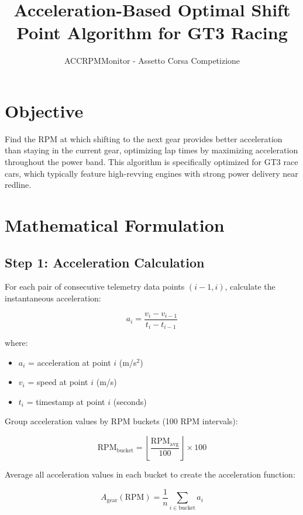 \documentclass[12pt]{article}
\title{Acceleration-Based Optimal Shift Point Algorithm for GT3 Racing}
\author{ACCRPMMonitor - Assetto Corsa Competizione}
\date{}
\begin{document}
\maketitle

\section{Objective}
Find the RPM at which shifting to the next gear provides better acceleration than staying in the current gear, optimizing lap times by maximizing acceleration throughout the power band. This algorithm is specifically optimized for GT3 race cars, which typically feature high-revving engines with strong power delivery near redline.

\section{Mathematical Formulation}

\subsection{Step 1: Acceleration Calculation}

For each pair of consecutive telemetry data points $(i-1, i)$, calculate the instantaneous acceleration:

\begin{equation}
a_i = \frac{v_i - v_{i-1}}{t_i - t_{i-1}}
\end{equation}

where:
\begin{itemize}
    \item $a_i$ = acceleration at point $i$ (m/s$^2$)
    \item $v_i$ = speed at point $i$ (m/s)
    \item $t_i$ = timestamp at point $i$ (seconds)
\end{itemize}

Group acceleration values by RPM buckets (100 RPM intervals):

\begin{equation}
\text{RPM}_{\text{bucket}} = \left\lfloor \frac{\text{RPM}_{\text{avg}}}{100} \right\rfloor \times 100
\end{equation}

Average all acceleration values in each bucket to create the acceleration function:

\begin{equation}
A_{\text{gear}}(\text{RPM}) = \frac{1}{n} \sum_{i \in \text{bucket}} a_i
\end{equation}
\end{document}
